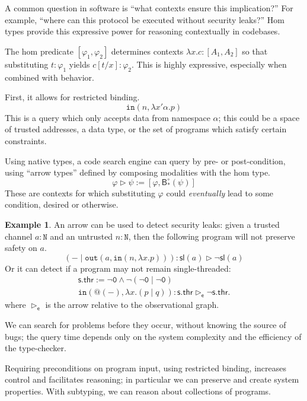 \documentclass[12pt]{article}
\theoremstyle{definition}
\newtheorem{example}[theorem]{Example}
\newcommand{\msf}[1]{\mathsf{#1}}
\newcommand{\mtt}[1]{\mathtt{#1}}
\newcommand{\N}{\mtt{N}}
\newcommand{\tto}{\mtt{out}}
\newcommand{\tti}{\mtt{in}}
\newcommand{\ttz}{\mtt{0}}
\begin{document}
A common question in software is ``what contexts ensure this implication?'' For example, ``where can this protocol be executed without security leaks?'' Hom types provide this expressive power for reasoning contextually in codebases.

The hom predicate $[\varphi_1,\varphi_2]$
determines contexts $\lambda x.c:[A_1,A_2]$ so that substituting $t:\varphi_1$ yields $c[t/x]:\varphi_2$. This is highly expressive, especially when combined with behavior.

First, it allows for restricted binding.
\[\tti(n,\lambda x'\alpha.p)\]
This is a query which only accepts data from namespace $\alpha$; this could be a space of trusted addresses, a data type, or the set of programs which satisfy certain constraints.

Using native types, a code search engine can query by pre- or post-condition, using ``arrow types'' defined by composing modalities with the hom type.
\[\varphi \rhd \psi := [\varphi,\msf{B}^\circ_*(\psi)]\]
These are contexts for which substituting $\varphi$ could \textit{eventually} lead to some condition, desired or otherwise.

\begin{example}
    An arrow can be used to detect security leaks: given a trusted channel $a:\N$ and an untrusted $n:\N$, then the following program will not preserve safety on $a$.
    \[(- \;|\; \tto(a,\tti(n,\lambda x.p))): \msf{sl}(a)\rhd \neg\msf{sl}(a)\]
    Or it can detect if a program may not remain single-threaded:
    \[\begin{array}{c}
        \msf{s.thr}:= \neg \ttz\land \neg(\neg \ttz \;|\; \neg\ttz)\\
        \tti(@(-),\lambda x.(p \;|\; q)) : \msf{s.thr}\rhd_\msf{e} \neg\msf{s.thr}.
    \end{array}\]
    where $\rhd_\msf{e}$ is the arrow relative to the observational graph.
    
    We can search for problems before they occur, without knowing the source of bugs; the query time depends only on the system complexity and the efficiency of the type-checker.
\end{example}

Requiring preconditions on program input, using restricted binding, increases control and facilitates reasoning; in particular we can preserve and create system properties. With subtyping, we can reason about collections of programs.
\end{document}
